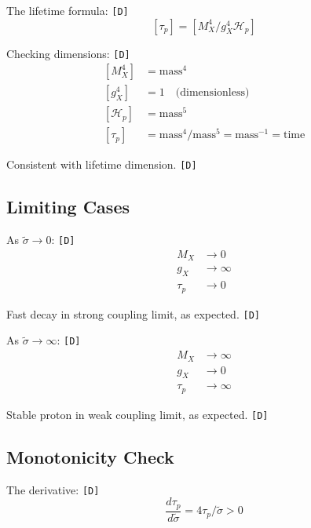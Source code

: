 \documentclass[11pt,a4paper]{article}
\newcommand{\tagD}{\textcolor{green!50!black}{\texttt{[D]}}}
\theoremstyle{definition}
\begin{document}
The lifetime formula: \tagD{}
\begin{equation}
\label{eq:dim-tau}
[\tau_p] = [M_X^4/g_X^4 \mathcal{H}_p]
\end{equation}

Checking dimensions: \tagD{}
\begin{align}
\label{eq:dim-check-1}
[M_X^4] &= \text{mass}^4 \\
\label{eq:dim-check-2}
[g_X^4] &= 1 \quad \text{(dimensionless)} \\
\label{eq:dim-check-3}
[\mathcal{H}_p] &= \text{mass}^5 \\
\label{eq:dim-check-4}
[\tau_p] &= \text{mass}^{4}/\text{mass}^5 = \text{mass}^{-1} = \text{time}
\end{align}

Consistent with lifetime dimension. \tagD{}

\subsection{Limiting Cases}
\label{app:limits}

As $\tilde{\sigma} \to 0$: \tagD{}
\begin{align}
\label{eq:limit-small-1}
M_X &\to 0 \\
\label{eq:limit-small-2}
g_X &\to \infty \\
\label{eq:limit-small-3}
\tau_p &\to 0
\end{align}

Fast decay in strong coupling limit, as expected. \tagD{}

As $\tilde{\sigma} \to \infty$: \tagD{}
\begin{align}
\label{eq:limit-large-1}
M_X &\to \infty \\
\label{eq:limit-large-2}
g_X &\to 0 \\
\label{eq:limit-large-3}
\tau_p &\to \infty
\end{align}

Stable proton in weak coupling limit, as expected. \tagD{}

\subsection{Monotonicity Check}
\label{app:monotone}

The derivative: \tagD{}
\begin{equation}
\label{eq:monotone-1}
\frac{d\tau_p}{d\tilde{\sigma}} = 4\tau_p/\tilde{\sigma} > 0
\end{equation}
\end{document}
